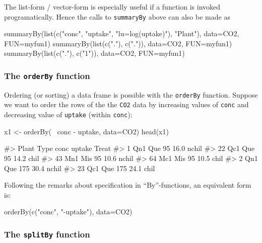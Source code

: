 The list-form / vector-form is especially useful if a function is
invoked programatically. Hence the calls to \texttt{summaryBy} above can
also be made as

\begin{Schunk}
\begin{Sinput}
summaryBy(list(c("conc", "uptake", "lu=log(uptake)"), "Plant"), data=CO2, FUN=myfun1)
summaryBy(list(c("."), c(".")), data=CO2, FUN=myfun1)
summaryBy(list(c("."), c("1")), data=CO2, FUN=myfun1)
\end{Sinput}
\end{Schunk}

\hypertarget{the-orderby-function}{%
\subsubsection{\texorpdfstring{The \texttt{orderBy}
function}{The orderBy function}}\label{the-orderby-function}}

Ordering (or sorting) a data frame is possible with the \texttt{orderBy}
function. Suppose we want to order the rows of the the \texttt{CO2} data
by increasing values of \texttt{conc} and decreasing value of
\texttt{uptake} (within \texttt{conc}):

\begin{Schunk}
\begin{Sinput}
x1 <- orderBy(~ conc - uptake, data=CO2)
head(x1)
\end{Sinput}
\begin{Soutput}
#>    Plant Type conc uptake Treat
#> 1    Qn1  Que   95   16.0 nchil
#> 22   Qc1  Que   95   14.2  chil
#> 43   Mn1  Mis   95   10.6 nchil
#> 64   Mc1  Mis   95   10.5  chil
#> 2    Qn1  Que  175   30.4 nchil
#> 23   Qc1  Que  175   24.1  chil
\end{Soutput}
\end{Schunk}

Following the remarks about specification in ``By''-functions, an
equivalent form is:

\begin{Schunk}
\begin{Sinput}
orderBy(c("conc", "-uptake"), data=CO2) 
\end{Sinput}
\end{Schunk}

\hypertarget{the-splitby-function}{%
\subsubsection{\texorpdfstring{The \texttt{splitBy}
function}{The splitBy function}}\label{the-splitby-function}}

